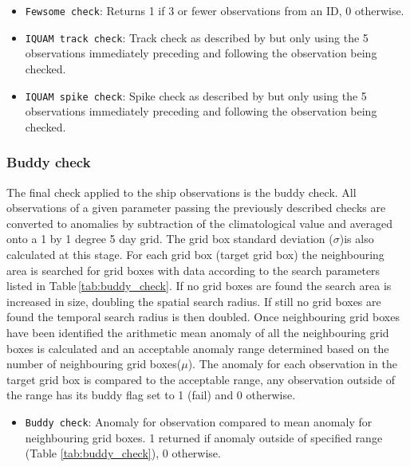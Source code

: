 \begin{itemize}[resume]
\item \texttt{Fewsome check}: Returns 1 if 3 or fewer observations from an ID, 0 otherwise.
\item \texttt{IQUAM track check}: Track check as described by \cite{Xu2014} but only using the 5 observations immediately preceding and following the observation being checked. 
\item \texttt{IQUAM spike check}: Spike check as described by \cite{Xu2014} but only using the 5 observations immediately preceding and following the observation being checked. 
\end{itemize}

\FloatBarrier
\subsubsection{Buddy check}
The final check applied to the ship observations is the buddy check.  
All observations of a given parameter passing the previously described checks are converted to anomalies by subtraction of the climatological value and averaged onto a 1 by 1 degree 5 day grid. 
The grid box standard deviation ($\sigma$)is also calculated at this stage.
For each grid box (target grid box) the neighbouring area is searched for grid boxes with data according to the search parameters listed in Table\,\ref{tab:buddy_check}.
If no grid boxes are found the search area is increased in size, doubling the spatial search radius.
If still no grid boxes are found the temporal search radius is then doubled.
Once neighbouring grid boxes have been identified the arithmetic mean anomaly of all the neighbouring grid boxes is calculated and an acceptable anomaly range determined based on the number of neighbouring grid boxes($\mu$).
The anomaly for each observation in the target grid box is compared to the acceptable range, any observation outside of the range has its buddy flag set to 1 (fail) and 0 otherwise.
\begin{itemize}[resume]
\item \texttt{Buddy check}: Anomaly for observation compared to mean anomaly for neighbouring grid boxes. 1 returned if anomaly outside of specified range (Table \ref{tab:buddy_check}), 0 otherwise.
\end{itemize}


